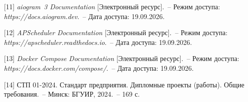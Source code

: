[11] \textit{aiogram~3 Documentation} [Электронный ресурс].~-- Режим доступа: \textit{https://docs.\allowbreak aiogram.\allowbreak dev}.~-- Дата доступа: 19.09.2026.

[12] \textit{APScheduler Documentation} [Электронный ресурс].~-- Режим доступа: \textit{https://apscheduler.\allowbreak readthedocs.\allowbreak io}.~-- Дата доступа: 19.09.2026.

[13] \textit{Docker Compose Documentation} [Электронный ресурс].~-- Режим доступа: \textit{https://docs.\allowbreak docker.\allowbreak com/\allowbreak compose/}.~-- Дата доступа: 19.09.2026.

[14] СТП 01-2024. Стандарт предприятия. Дипломные проекты (работы). Общие требования.~-- Минск: БГУИР, 2024.~-- 169 с.
